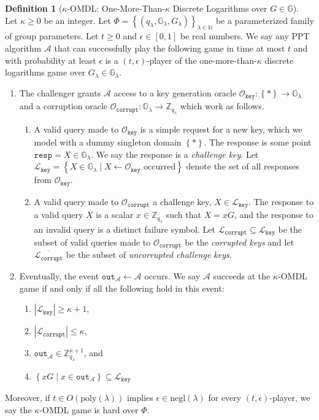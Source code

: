 \documentclass[11pt]{article}
\theoremstyle{definition}
\newtheorem{definition}[definition]{Definition}
\newcommand{\G}{\mathbb{G}}
\newcommand{\bbn}{\mathbb{N}}
\newcommand{\secpar}{\lambda}
\newcommand{\polysecpar}{O(\text{poly}(\secpar))}
\newcommand{\negl}{\text{negl}(\secpar)}
\newcommand{\corruptionOracle}{\mathcal{O}_{\texttt{corrupt}}}
\newcommand{\keyOracle}{\mathcal{O}_{\texttt{key}}}
\newcommand{\challengeKeySet}{\mathcal{L}_{\texttt{key}}}
\newcommand{\corruptedKeySet}{\mathcal{L}_{\texttt{corrupt}}}
\begin{document}
\begin{definition}[$\kappa$-OMDL: One-More-Than-$\kappa$ Discrete Logarithms over $G \in \G$]\label{def:omdl}
Let $\kappa \geq 0$ be an integer. Let $ \Phi = \left\{(q_\secpar, \G_\secpar, G_\secpar)\right\}_{\secpar \in \bbn}$ be a parameterized family of group parameters. Let $t \geq 0$ and $\epsilon \in [0, 1]$ be real numbers. We say any PPT algorithm $\mathcal{A}$ that can successfully play the following game in time at most $t$ and with probability at least $\epsilon$ is a $(t,\epsilon)$-player of the one-more-than-$\kappa$ discrete logarithms game over $G_\secpar \in \G_\secpar$.
\begin{enumerate}
\item The challenger grants $\mathcal{A}$ access to a key generation oracle $\keyOracle:\left\{\ast\right\} \to \G_\secpar$ and a corruption oracle $\corruptionOracle: \G_\secpar \to \mathbb{Z}_{q_\secpar}$ which work as follows.
\begin{enumerate}
\item A valid query made to $\keyOracle$ is a simple request for a new key, which we model with a dummy singleton domain $\left\{\ast\right\}$. The response is some point $\texttt{resp}=X \in \G_\secpar$. We say the response is a \textit{challenge key}. Let $\challengeKeySet = \left\{X \in \G_\secpar \mid X \leftarrow \keyOracle\text{ occurred}\right\}$ denote the set of all responses from $\keyOracle$.

\item A valid query made to $\corruptionOracle$ a challenge key, $X \in \challengeKeySet$. The response to a valid query $X$ is a scalar $x \in \mathbb{Z}_{q_\secpar}$ such that $X = xG$, and the response to an invalid query is a distinct failure symbol. Let $\corruptedKeySet \subseteq \challengeKeySet$ be the subset of valid queries made to $\corruptionOracle$ be the \textit{corrupted keys} and let $\overline{\corruptedKeySet}$ be the subset of \textit{uncorrupted challenge keys}.
\end{enumerate}
   \item Eventually, the event $\texttt{out}_\mathcal{A} \leftarrow \mathcal{A}$ occurs. We say $\mathcal{A}$ succeeds at the $\kappa$-OMDL game if and only if all the following hold in this event:
\begin{enumerate}
\item $\left|\challengeKeySet\right| \geq \kappa + 1$,
\item $\left|\corruptedKeySet\right| \leq \kappa$,
\item $\texttt{out}_{\mathcal{A}} \in \mathbb{Z}_{q_\secpar}^{\kappa+1}$, and
\item $\left\{xG \mid x \in \texttt{out}_{\mathcal{A}}\right\} \subseteq \challengeKeySet$

\end{enumerate}
\end{enumerate}
Moreover, if $t \in \polysecpar$ implies $\epsilon \in \negl$ for every $(t, \epsilon)$-player, we say the $\kappa$-OMDL game is hard over $\Phi$.
\end{definition}
\end{document}
